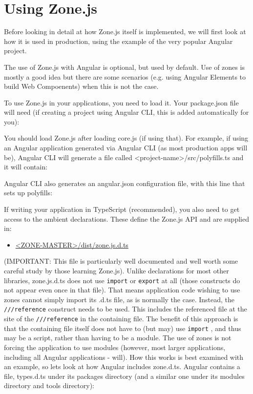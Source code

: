 \section{Using Zone.js}

Before looking in detail at how Zone.js itself is implemented, we will first look at how
it is used in production, using the example of the very popular Angular project.

The use of Zone.js with Angular is optional, but used by default. Use of zones is
mostly a good idea but there are some scenarios (e.g. using Angular Elements to build
Web Compoenents) when this is not the case.

To use Zone.js in your applications, you need to load it. Your package.json file will
need (if creating a project using Angular CLI, this is added automatically for you):



You should load Zone.js after loading core.js (if using that). For example, if using an
Angular application generated via Angular CLI (as most production apps will be),
Angular CLI will generate a file called <project-name>/src/polyfills.ts and it will
contain:



Angular CLI also generates an angular.json configuration file, with this line that sets
up polyfills:



If writing your application in TypeScript (recommended), you also need to get access
to the ambient declarations. These define the Zone.js API and are supplied in:

\begin{itemize}
  \item \href{https://github.com/angular/zone.js/blob/master/dist/zone.js.d.ts}
        {<ZONE-MASTER>/dist/zone.js.d.ts}
\end{itemize}

(IMPORTANT: This file is particularly well documented and well worth some careful
study by those learning Zone.js). Unlike declarations for most other libraries,
zone.js.d.ts does not use
\texttt{import}
or
\texttt{export}
at all (those constructs do not appear
even once in that file). That means application code wishing to use zones cannot
simply import its .d.ts file, as is normally the case. Instead, the
\texttt{///reference}
construct needs to be used. This includes the referenced file at the site of the
\texttt{///reference}
in the containing file. The benefit of this approach is that the containing
file itself does not have to (but may) use
\texttt{import}
, and thus may be a script, rather
than having to be a module. The use of zones is not forcing the application to use
modules (however, most larger applications, including all Angular applications - will).
How this works is best examined with an example, so lets look at how Angular
includes zone.d.ts. Angular contains a file, types.d.ts under its packages directory
(and a similar one under its modules directory and tools directory):

